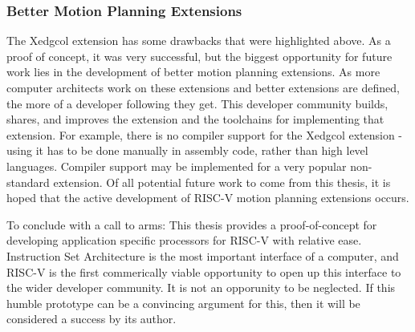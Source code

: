     \subsubsection{Better Motion Planning Extensions}
    The Xedgcol extension has some drawbacks that were highlighted above. As a proof of concept, it was very successful, but the biggest opportunity for future work lies in the development of better motion planning extensions. As more computer architects work on these extensions and better extensions are defined, the more of a developer following they get. This developer community builds, shares, and improves the extension and the toolchains for implementing that extension. For example, there is no compiler support for the Xedgcol extension - using it has to be done manually in assembly code, rather than high level languages. Compiler support may be implemented for a very popular non-standard extension. Of all potential future work to come from this thesis, it is hoped that the active development of RISC-V motion planning extensions occurs.

    \bigskip


    \noindent To conclude with a call to arms: This thesis provides a proof-of-concept for developing application specific processors for RISC-V with relative ease. Instruction Set Architecture is the most important interface of a computer, and RISC-V is the first commerically viable opportunity to open up this interface to the wider developer community. It is not an opporunity to be neglected. If this humble prototype can be a convincing argument for this, then it will be considered a success by its author. 
